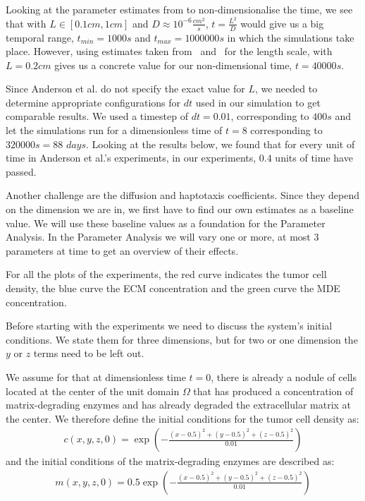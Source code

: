 Looking at the parameter estimates from \cite{anderson_mathematical_2000} to non-dimensionalise the time, we see that with $L \in [0.1cm,1cm]$ and $D\approx 10^{-6}\frac{cm^2}{s}$, $t = \frac{L^2}{D}$ would give us a big temporal range, $t_{min} = 1000s$ and $t_{max} = 1000000s$ in which the simulations take place. However, using estimates taken from~\cite{STEPHANOU200696} and~\cite{franssen_mathematical_2019} for the length scale, with $L=0.2cm$ gives us a concrete value for our non-dimensional time, $t=40000s$.

Since Anderson et al. do not specify the exact value for $L$, we needed to determine appropriate configurations for $dt$ used in our simulation to get comparable results. We used a timestep of $dt=0.01$, corresponding to $400s$ and let the simulations run for a dimensionless time of $t=8$ corresponding to $320000s=88$ $days$. Looking at the results below, we found that for every unit of time in Anderson et al.'s experiments, in our experiments, $0.4$ units of time have passed.

Another challenge are the diffusion and haptotaxis coefficients. Since they depend on the dimension we are in, we first have to find our own estimates as a baseline value. We will use these baseline values as a foundation for the Parameter Analysis. In the Parameter Analysis we will vary one or more, at most 3 parameters at time to get an overview of their effects. 

For all the plots of the experiments, the red curve indicates the tumor cell density, the blue curve the ECM concentration and the green curve the MDE concentration.

Before starting with the experiments we need to discuss the system's initial conditions. We state them for three dimensions, but for two or one dimension the $y$ or $z$ terms need to be left out.

We assume for that at dimensionless time $t=0$, there is already a nodule of cells located at the center of the unit domain $\Omega$ that has produced a concentration of matrix-degrading enzymes and has already degraded the extracellular matrix at the center. We therefore define the initial conditions for the tumor cell density as:
\begin{align*}
    c(x,y,z,0)= \exp(-\frac{(x-0.5)^2+(y-0.5)^2+(z-0.5)^2}{0.01})
\end{align*}
and the initial conditions of the matrix-degrading enzymes are described as:
\begin{align*}
    m(x,y,z,0) = 0.5 \exp(-\frac{(x-0.5)^2+(y-0.5)^2+(z-0.5)^2}{0.01})
\end{align*}

